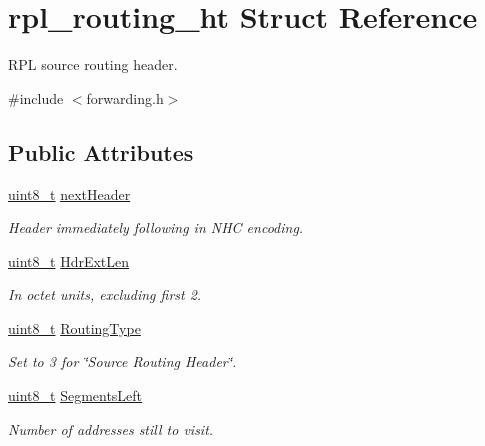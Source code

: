 \hypertarget{structrpl__routing__ht}{}\section{rpl\+\_\+routing\+\_\+ht Struct Reference}
\label{structrpl__routing__ht}


R\+PL source routing header.  




{\ttfamily \#include $<$forwarding.\+h$>$}

\subsection*{Public Attributes}
\begin{DoxyCompactItemize}
\item 
\hyperlink{_p_e___types_8h_aba7bc1797add20fe3efdf37ced1182c5}{uint8\+\_\+t} \hyperlink{structrpl__routing__ht_a6d629e14f23a486e842b2e7a99b6a8f7}{next\+Header}
\begin{DoxyCompactList}\small\item\em Header immediately following in N\+HC encoding. \end{DoxyCompactList}\item 
\hyperlink{_p_e___types_8h_aba7bc1797add20fe3efdf37ced1182c5}{uint8\+\_\+t} \hyperlink{structrpl__routing__ht_a1e766c282c888be7cb810454e550a256}{Hdr\+Ext\+Len}
\begin{DoxyCompactList}\small\item\em In octet units, excluding first 2. \end{DoxyCompactList}\item 
\hyperlink{_p_e___types_8h_aba7bc1797add20fe3efdf37ced1182c5}{uint8\+\_\+t} \hyperlink{structrpl__routing__ht_a1e9bde8dde29dd53ab35fe797d850768}{Routing\+Type}
\begin{DoxyCompactList}\small\item\em Set to 3 for \char`\"{}\+Source Routing Header\char`\"{}. \end{DoxyCompactList}\item 
\hyperlink{_p_e___types_8h_aba7bc1797add20fe3efdf37ced1182c5}{uint8\+\_\+t} \hyperlink{structrpl__routing__ht_acce5a43a26b640f88f370dbd323e49fd}{Segments\+Left}
\begin{DoxyCompactList}\small\item\em Number of addresses still to visit. \end{DoxyCompactList}\item 

\end{DoxyCompactItemize}
